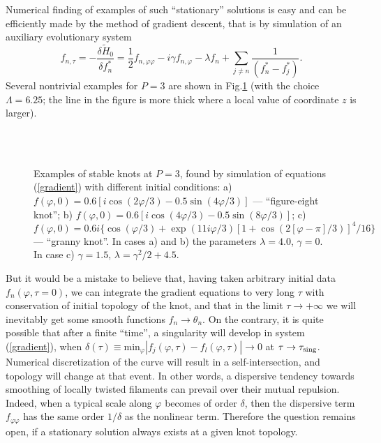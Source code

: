 \documentclass[pra,twocolumn,showpacs]{revtex4}
\begin{document}
Numerical finding of examples of such ``stationary'' solutions is easy and can be efficiently made
by the method of gradient descent, that is by simulation of an auxiliary evolutionary system
\begin{equation}
f_{n,\tau}=-\frac{\delta \tilde H_0}{\delta f^*_n}=\frac{1}{2}f_{n,\varphi\varphi}
-i\gamma f_{n,\varphi}-\lambda f_n
+\sum_{j\neq n}\frac{1}{(f^*_n-f^*_j)}.
\label{gradient}
\end{equation}
Several nontrivial examples for $P=3$ are shown in Fig.\ref{braid} (with the choice $\Lambda =6.25$;
the line in the figure is more thick where a local value of coordinate $z$ is larger).
\begin{figure}
\begin{center}
\\
\\
\end{center}
\caption{Examples of stable knots at $P=3$, found by simulation of equations  (\ref{gradient})
with different initial conditions:
a) $f(\varphi,0)=0.6[i\cos(2\varphi/3)-0.5\sin(4\varphi/3)]$ --- ``figure-eight knot''; 
b) $f(\varphi,0)=0.6[i\cos(4\varphi/3)-0.5\sin(8\varphi/3)]$; c) 
$f(\varphi,0)=0.6i\{\cos(\varphi/3)+\exp(11i\varphi/3)[1+\cos(2[\varphi-\pi]/3)]^4/16\}$ ---
``granny knot''. In cases a) and b) the parameters $\lambda=4.0$,  $\gamma=0$. 
In case c) $\gamma=1.5$, $\lambda=\gamma^2/2+4.5$.}
\label{braid} 
\end{figure}

But it would be a mistake to believe that, having taken arbitrary initial data $f_n(\varphi,\tau=0)$, 
we can integrate the gradient equations to very long $\tau$ with conservation of initial topology
of the knot, and that in the limit $\tau\to+\infty$ we will inevitably get some smooth functions 
$f_n\to\theta_n$. On the contrary, it is quite possible that after a finite ``time'',
a singularity will develop in system  (\ref{gradient}), when 
$\delta(\tau)\equiv\mbox{min}_\varphi |f_{j}(\varphi, \tau)-f_{l}(\varphi, \tau)|\to 0$ 
at $\tau\to \tau_{\rm sing}$. Numerical discretization of the curve will result in a self-intersection,
and topology will change at that event. In other words, a dispersive tendency towards smoothing
of locally twisted filaments can prevail over their mutual repulsion. Indeed, when a typical scale
along $\varphi$ becomes of order $\delta$, then the dispersive term $f_{\varphi\varphi}$ has the same 
order $1/\delta$ as the nonlinear term. Therefore the question remains open, if a stationary solution
always exists at a given knot topology.
 
\end{document}
